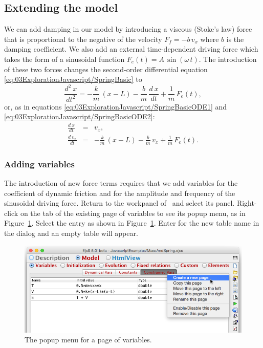 \subsection{Extending the model}\label{section:03ExplorationJavascriptModifyingModel}
We can add damping in our model by introducing a viscous (Stoke's law) force that is proportional to the negative of
the velocity $F_f = - b\,v_x$ where $b$ is the damping coefficient. We also add an external time-dependent driving
force which takes the form of a sinusoidal function $F_e(t)=A\,\sin(\omega\, t)$. The introduction of these two forces
changes the second-order differential equation \eqref{eq:03ExplorationJavascript/SpringBasic} to
\begin{equation}
  \frac{d^2\ x}{dt^2} = -\frac{k}{m}\,(x-L) - \frac{b}{m}\,\frac{d\ x}{dt} + \frac{1}{m}\,F_e(t), \label{eq:03ExplorationJavascript/SpringComplete}
\end{equation}
or, as in equations \eqref{eq:03ExplorationJavascript/SpringBasicODE1} and \eqref{eq:03ExplorationJavascript/SpringBasicODE2}:
\begin{eqnarray}
  \frac{d\ x} {dt} &=& v_x,                  \label{eq:03ExplorationJavascript/SpringCompleteODE1} \\
  \frac{d\ v_x}{dt} &=& -\frac{k}{m}\,(x-L) - \frac{b}{m}\,v_x + \frac{1}{m}\,F_e(t). \label{eq:03ExplorationJavascript/SpringCompleteODE2}
\end{eqnarray}

\subsubsection{Adding variables}
The introduction of new force terms requires that we add variables for the coefficient of dynamic friction and for the amplitude and frequency of the sinusoidal driving force.  Return to the  workpanel of \ejs\ and select its  panel. Right-click on the tab of the existing page of variables to see its popup menu, as in Figure~\ref{fig:03ExplorationJavascript/ModifyVariables1}.
Select the  entry as shown in Figure~\ref{fig:03ExplorationJavascript/ModifyVariables1}. Enter  for the new table name in the dialog and an empty table will appear.

\begin{figure}[htb]
    \centering
  \includegraphics[scale=\scale]{03ExplorationJavascript/images/ModifyVariables1.png}
    \caption{The popup menu for a page of variables.}
    \label{fig:03ExplorationJavascript/ModifyVariables1}
\end{figure}

